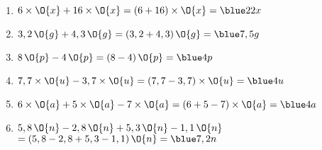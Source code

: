    \ \\ [-5mm]
   \begin{enumerate}
      \item $6\times\O{x}+16\times\O{x} =(6+16)\times\O{x} =\blue 22x$
      \item $3,2\,\O{g}+4,3\,\O{g} =(3,2+4,3)\,\O{g} =\blue 7,5g$
      \item $8\,\O{p}-4\,\O{p} =(8-4)\,\O{p} =\blue 4p$
      \item $7,7\times\O{u}-3,7\times\O{u} =(7,7-3,7)\times\O{u} =\blue 4u$
      \item $6\times\O{a}+5\times\O{a}-7\times\O{a} =(6+5-7)\times\O{a} =\blue 4a$
      \item $5,8\,\O{n}-2,8\,\O{n}+5,3\,\O{n}-1,1\,\O{n}$ \\
         \qquad $=(5,8-2,8+5,3-1,1)\,\O{n} =\blue 7,2n$
   \end{enumerate}
